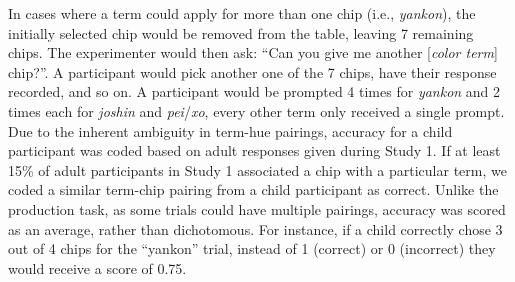 \documentclass[
  english,
  ,man,floatsintext]{apa6}
\begin{document}
In cases where a term could apply for more than one chip (i.e., \emph{yankon}), the initially selected chip would be removed from the table, leaving 7 remaining chips. The experimenter would then ask: \enquote{Can you give me another {[}\emph{color term}{]} chip?}. A participant would pick another one of the 7 chips, have their response recorded, and so on. A participant would be prompted 4 times for \emph{yankon} and 2 times each for \emph{joshin} and \emph{pei}/\emph{xo}, every other term only received a single prompt. Due to the inherent ambiguity in term-hue pairings, accuracy for a child participant was coded based on adult responses given during Study 1. If at least 15\% of adult participants in Study 1 associated a chip with a particular term, we coded a similar term-chip pairing from a child participant as correct. Unlike the production task, as some trials could have multiple pairings, accuracy was scored as an average, rather than dichotomous. For instance, if a child correctly chose 3 out of 4 chips for the \enquote{yankon} trial, instead of 1 (correct) or 0 (incorrect) they would receive a score of 0.75.
\end{document}
